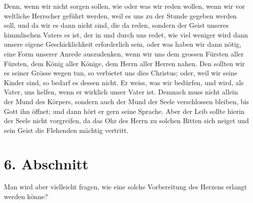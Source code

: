  
Denn, wenn wir nicht sorgen sollen, wie oder was wir reden
wollen, wenn wir vor
weltliche Herrscher
geführt werden, weil es uns zu der Stunde gegeben werden soll, und da wir es
dann nicht sind, die da reden, sondern der Geist unseres himmlischen Vaters es
ist, der in und durch uns redet, wie viel weniger wird dann unsere eigene
Geschicklichkeit erforderlich sein, oder was haben wir dann nötig, eine Form
unserer Anrede
auszudenken, wenn wir uns dem grossen Fürsten aller Fürsten, dem König aller
Könige, dem Herrn aller Herren nahen. Den sollten wir es seiner Grösse wegen
tun, so verbietet uns dies Christus; oder, weil wir seine Kinder sind, so
bedarf es dessen nicht. Er weiss, was wir bedürfen, und wird, als Vater, uns
helfen, wenn er wirklich unser Vater ist. Demnach muss nicht allein der Mund des
Körpers, sondern auch der Mund
der Seele verschlossen bleiben, bis Gott ihn öffnet; und dann hört er gern seine
Sprache. Aber der Leib sollte hierin der Seele nicht vorgreifen, da das Ohr des
Herrn zu solchen Bitten sich neiget und sein Geist die Flehenden mächtig
vertritt.

\section{6. Abschnitt} \label{kap6_ab6}

Man wird aber vielleicht fragen, wie eine solche Vorbereitung des
Herzens erlangt werden könne?

\medskip

